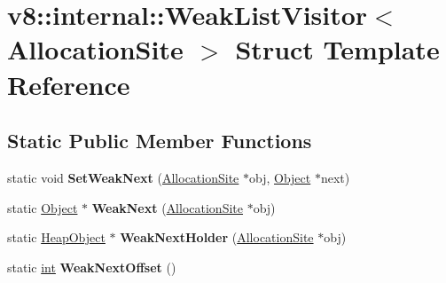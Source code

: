 \hypertarget{structv8_1_1internal_1_1WeakListVisitor_3_01AllocationSite_01_4}{}\section{v8\+:\+:internal\+:\+:Weak\+List\+Visitor$<$ Allocation\+Site $>$ Struct Template Reference}
\label{structv8_1_1internal_1_1WeakListVisitor_3_01AllocationSite_01_4}
\subsection*{Static Public Member Functions}
\begin{DoxyCompactItemize}
\item 
\mbox{\label{structv8_1_1internal_1_1WeakListVisitor_3_01AllocationSite_01_4_a6c05aafa103a399c030a6c24ba1d8c52}} 
static void {\bfseries Set\+Weak\+Next} (\mbox{\hyperlink{classv8_1_1internal_1_1AllocationSite}{Allocation\+Site}} $\ast$obj, \mbox{\hyperlink{classv8_1_1internal_1_1Object}{Object}} $\ast$next)
\item 
\mbox{\label{structv8_1_1internal_1_1WeakListVisitor_3_01AllocationSite_01_4_aba201f71b26e8f687a75338730e921ca}} 
static \mbox{\hyperlink{classv8_1_1internal_1_1Object}{Object}} $\ast$ {\bfseries Weak\+Next} (\mbox{\hyperlink{classv8_1_1internal_1_1AllocationSite}{Allocation\+Site}} $\ast$obj)
\item 
\mbox{\label{structv8_1_1internal_1_1WeakListVisitor_3_01AllocationSite_01_4_afcce1aa059586bc20aaa2edaea164aa5}} 
static \mbox{\hyperlink{classv8_1_1internal_1_1HeapObject}{Heap\+Object}} $\ast$ {\bfseries Weak\+Next\+Holder} (\mbox{\hyperlink{classv8_1_1internal_1_1AllocationSite}{Allocation\+Site}} $\ast$obj)
\item 
\mbox{\label{structv8_1_1internal_1_1WeakListVisitor_3_01AllocationSite_01_4_a1d96c170e9e8c3ffff1c3fb771872662}} 
static \mbox{\hyperlink{classint}{int}} {\bfseries Weak\+Next\+Offset} ()
\item 

\end{DoxyCompactItemize}
